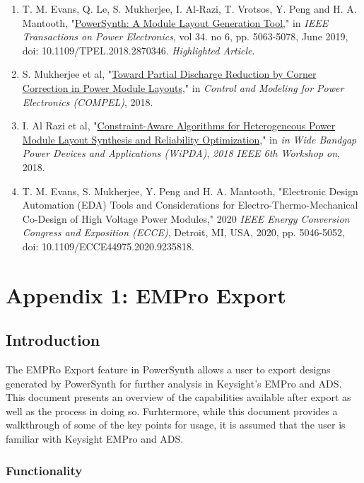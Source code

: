 \documentclass[11pt]{article}
\begin{document}
\begin{enumerate}
\item T. M. Evans, Q. Le, S. Mukherjee, I. Al-Razi, T. Vrotsos, Y. Peng and H. A. Mantooth, "\href{./Publications/PowerSynth-A_Module_Layout_Generation_Tool.pdf}{PowerSynth: A Module Layout Generation Tool}," in \emph{IEEE Transactions on Power Electronics}, vol 34. no 6, pp. 5063-5078, June 2019,  doi: 10.1109/TPEL.2018.2870346. \emph{Highlighted Article}.

\item S. Mukherjee et al, "\href{./Publications/PID5441927.pdf}{Toward Partial Discharge Reduction by Corner Correction in Power Module Layouts}," in \emph{Control and Modeling for Power Electronics (COMPEL)}, 2018.


\item I. Al Razi et al, "\href{./Publications/WIPDA_2018.pdf}{Constraint-Aware Algorithms for Heterogeneous Power Module Layout Synthesis and Reliability Optimization}," in \emph{in Wide Bandgap Power Devices and Applications (WiPDA)}, \emph{2018 IEEE 6th Workshop on}, 2018.

\item T. M. Evans, S. Mukherjee, Y. Peng and H. A. Mantooth, "Electronic Design Automation (EDA) Tools and Considerations for Electro-Thermo-Mechanical Co-Design of High Voltage Power Modules," 2020 \emph{IEEE Energy Conversion Congress and Exposition (ECCE)}, Detroit, MI, USA, 2020, pp. 5046-5052, doi: 10.1109/ECCE44975.2020.9235818.
\end{enumerate}



\pagebreak

\section{Appendix 1: EMPro Export}
\label{sec-5}
\subsection{Introduction}
\label{sec-5-1}

The EMPRo Export feature in PowerSynth allows a user to export designs generated by PowerSynth for further analysis in Keysight's EMPro and ADS. This document presents an overview of the capabilities available after export as well as the process in doing so. Furhtermore, while this document provides a walkthrough of some of the key points for usage, it is assumed that the user is familiar with Keysight EMPro and ADS.

\subsubsection{Functionality}
\label{sec-5-1-1}
\end{document}
